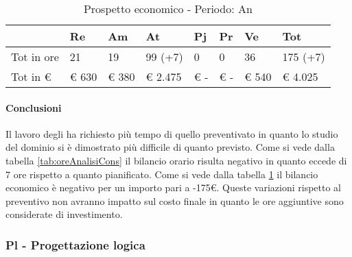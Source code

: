 								\begin{table}[H] \begin{center} \begin{tabular}{llllllll}
								\toprule
									&	\textbf{Re}	&	\textbf{Am}	&	\textbf{At}	&	\textbf{Pj}	&	\textbf{Pr}	&	\textbf{Ve}	&	\textbf{Tot}	 \\
								\midrule
								Tot in ore	&	21		&	19		&	99 (+7)	&	0		&	0		&	36		&	175	(+7)\\
								Tot in €	&	 € 630 		&	 € 380 		&	 € 2.475 		&	 € -   		&	 € -   		&	 € 540 		&	 € 4.025 	\\
								\bottomrule
								\end{tabular} \end{center} \caption{Prospetto economico - Periodo:
								An
								}\label{tab:sAnCons} \end{table}

			\paragraph{Conclusioni}
			Il lavoro degli \analisti{} ha richiesto più tempo di quello preventivato in quanto lo studio del dominio si è dimostrato più difficile di quanto previsto. Come si vede dalla tabella \ref{tab:oreAnalisiCons} il bilancio orario risulta negativo in quanto eccede di 7 ore rispetto a quanto pianificato.
			Come si vede dalla tabella \ref{tab:sAnCons} il bilancio economico è negativo per un importo pari a -175€.
			Queste variazioni rispetto al preventivo non avranno impatto sul costo finale in quanto le ore aggiuntive sono considerate di investimento.

	\newpage
	\subsubsection{Pl - Progettazione logica}
